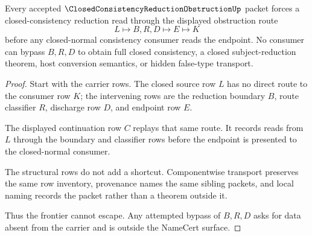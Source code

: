 \begin{theorem}
\label{thm:closed-consistency-reduction-obstruction-frontier-nonescape}
Every accepted $\ClosedConsistencyReductionObstructionUp$ packet forces a closed-consistency reduction read through the displayed obstruction route
$$
L\longmapsto B,R,D\longmapsto E\longmapsto K
$$
before any closed-normal consistency consumer reads the endpoint. No consumer can bypass $B,R,D$ to obtain full closed consistency, a closed subject-reduction theorem, host conversion semantics, or hidden false-type transport.
\end{theorem}
\begin{proof}
Start with the carrier rows. The closed source row $L$ has no direct route to the consumer row $K$; the intervening rows are the reduction boundary $B$, route classifier $R$, discharge row $D$, and endpoint row $E$.

The displayed continuation row $C$ replays that same route. It records reads from $L$ through the boundary and classifier rows before the endpoint is presented to the closed-normal consumer.

The structural rows do not add a shortcut. Componentwise transport preserves the same row inventory, provenance names the same sibling packets, and local naming records the packet rather than a theorem outside it.

Thus the frontier cannot escape. Any attempted bypass of $B,R,D$ asks for data absent from the carrier and is outside the NameCert surface.
\end{proof}

